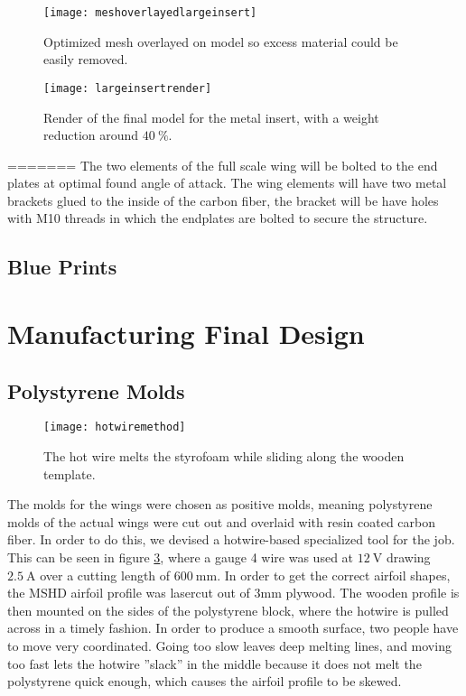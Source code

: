   \begin{figure}
    \texttt{[image: meshoverlayedlargeinsert]}
    \caption{Optimized mesh overlayed on model so excess material could be easily removed.}
    \label{fig:meshoverlay}
  \end{figure}

  \begin{figure}
    \texttt{[image: largeinsertrender]}
    \caption{Render of the final model for the metal insert, with a weight reduction around $\SI{40}{\%}$.}
    \label{fig:render_large_insert}
  \end{figure}
=======
  The two elements of the full scale wing will be bolted to the end plates at optimal found angle of attack. The wing elements will have two metal brackets glued to the inside of the carbon fiber, the bracket will be have holes with M10 threads in which the endplates are bolted to secure the structure.

  \subsection{Blue Prints}

\section{Manufacturing Final Design}
  \subsection{Polystyrene Molds}

  \begin{figure}
    \texttt{[image: hotwiremethod]}
    \caption{The hot wire melts the styrofoam while sliding along the wooden template.}
    \label{fig:hotwire}
  \end{figure}

  The molds for the wings were chosen as positive molds, meaning polystyrene molds of the actual wings were cut out and overlaid with resin coated carbon fiber. In order to do this, we devised a hotwire-based specialized tool for the job. This can be seen in figure \ref{fig:hotwire}, where a gauge 4 wire was used at $\SI{12}{\volt}$ drawing $\SI{2.5}{\ampere}$ over a cutting length of $\SI{600}{\milli\metre}$. In order to get the correct airfoil shapes, the MSHD airfoil profile was lasercut out of 3mm plywood. The wooden profile is then mounted on the sides of the polystyrene block, where the hotwire is pulled across in a timely fashion. In order to produce a smooth surface, two people have to move very coordinated. Going too slow leaves deep melting lines, and moving too fast lets the hotwire ''slack'' in the middle because it does not melt the polystyrene quick enough, which causes the airfoil profile to be skewed.

